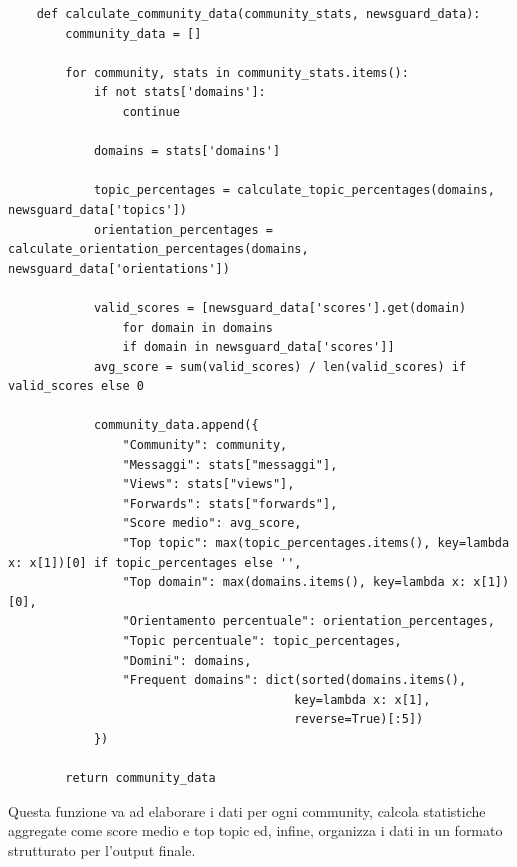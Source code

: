 \documentclass[12pt]{article}
\begin{document}
	\begin{lstlisting}
	def calculate_community_data(community_stats, newsguard_data):
		community_data = []
		
		for community, stats in community_stats.items():
			if not stats['domains']:
				continue
		
			domains = stats['domains']
		
			topic_percentages = calculate_topic_percentages(domains, newsguard_data['topics'])
			orientation_percentages = calculate_orientation_percentages(domains, newsguard_data['orientations'])
		
			valid_scores = [newsguard_data['scores'].get(domain) 
				for domain in domains 
				if domain in newsguard_data['scores']]
			avg_score = sum(valid_scores) / len(valid_scores) if valid_scores else 0
		
			community_data.append({
				"Community": community,
				"Messaggi": stats["messaggi"],
				"Views": stats["views"],
				"Forwards": stats["forwards"],
				"Score medio": avg_score,
				"Top topic": max(topic_percentages.items(), key=lambda x: x[1])[0] if topic_percentages else '',
				"Top domain": max(domains.items(), key=lambda x: x[1])[0],
				"Orientamento percentuale": orientation_percentages,
				"Topic percentuale": topic_percentages,
				"Domini": domains,
				"Frequent domains": dict(sorted(domains.items(),
										key=lambda x: x[1], 
										reverse=True)[:5])
			})
		
		return community_data
	\end{lstlisting}
	Questa funzione va ad elaborare i dati per ogni community, calcola statistiche aggregate come score medio e top topic ed, infine, organizza i dati in un formato strutturato per l'output finale.
\end{document}
